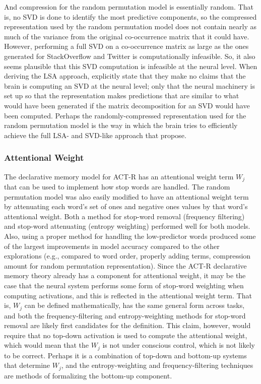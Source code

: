 \documentclass[man,floatsintext,donotrepeattitle]{apa6}
\begin{document}
And compression for the random permutation model is essentially random.
That is, no SVD is done to identify the most predictive components,
so the compressed representation used by the random permutation model does not contain nearly as much of the variance from the original co-occurrence matrix that it could have.
However, performing a full SVD on a co-occurrence matrix as large as the ones generated for StackOverflow and Twitter is computationally infeasible.
So, it also seems plausible that this SVD computation is infeasible at the neural level.
When deriving the LSA approach, \textcite{Landauer1997} explicitly state that they make no claims that the brain is computing an SVD at the neural level;
only that the neural machinery is set up so that the representation makes predictions that are similar to what would have been generated if the matrix decomposition for an SVD would have been computed.
Perhaps the randomly-compressed representation used for the random permutation model is the way in which the brain tries to efficiently achieve the full LSA- and SVD-like approach that \citeauthor{Landauer1997} propose.

\subsubsection{Attentional Weight}

The declarative memory model for ACT-R has an attentional weight term $W_{j}$ that can be used to implement how stop words are handled.
The random permutation model was also easily modified to have an attentional weight term by attenuating each word's set of ones and negative ones values by that word's attentional weight.
Both a method for stop-word removal (frequency filtering) and stop-word attenuating (entropy weighting) performed well for both models.
Also, using a proper method for handling the low-predictor words produced some of the largest improvements in model accuracy compared to the other explorations
(e.g., compared to word order, properly adding terms, compression amount for random permutation representation).
Since the ACT-R declarative memory theory already has a component for attentional weight, it may be the case that the neural system performs some form of stop-word weighting when computing activations,
and this is reflected in the attentional weight term.
That is, $W_{j}$ can be defined mathematically, has the same general form across tasks, and both the frequency-filtering and entropy-weighting methods for stop-word removal are likely first candidates for the definition.
This claim, however, would require that no top-down activation is used to compute the attentional weight, which would mean that the $W_{j}$ is not under conscious control, which is not likely to be correct.
Perhaps it is a combination of top-down and bottom-up systems that determine $W_{j}$, and the entropy-weighting and frequency-filtering techniques are methods of formalizing the bottom-up component.
\end{document}
